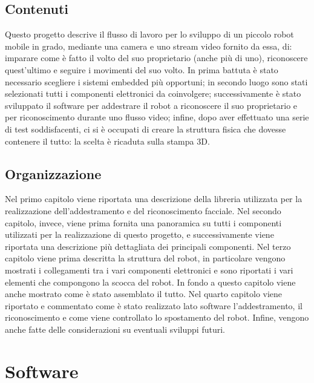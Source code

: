 \documentclass[12pt]{report}
\begin{document}
\section*{Contenuti}
Questo progetto descrive il flusso di lavoro per lo sviluppo di un piccolo robot mobile in grado, mediante una camera e uno stream video fornito da essa, di: imparare come \`e fatto il volto del suo proprietario (anche pi\`u di uno), riconoscere quest'ultimo e seguire i movimenti del suo volto. In prima battuta \`e
stato necessario scegliere i sistemi embedded pi\`u opportuni; in secondo luogo sono stati selezionati tutti i componenti elettronici da coinvolgere; successivamente \`e stato sviluppato il software per addestrare il robot a riconoscere il suo proprietario e per riconoscimento durante uno flusso video; infine, dopo aver effettuato una serie di test soddisfacenti, ci si \`e occupati di creare la struttura fisica che dovesse contenere il tutto: la scelta è ricaduta sulla stampa 3D.

	
\section*{Organizzazione}
Nel primo capitolo viene riportata una descrizione della libreria utilizzata per la realizzazione dell'addestramento e del riconoscimento facciale.
Nel secondo capitolo, invece, viene prima fornita una panoramica su tutti i componenti utilizzati per la realizzazione di questo progetto, e successivamente viene riportata una descrizione pi\`u dettagliata dei principali componenti.
Nel terzo capitolo viene prima descritta la struttura del robot, in particolare vengono mostrati i collegamenti tra i vari componenti elettronici e sono riportati i vari elementi che compongono la scocca del robot. In fondo a questo capitolo viene anche mostrato come \`e stato assemblato il tutto.
Nel quarto capitolo viene riportato e commentato come \`e stato realizzato lato software l'addestramento, il riconoscimento e come viene controllato lo spostamento del robot.
Infine, vengono anche fatte delle considerazioni su eventuali sviluppi futuri.
	

\chapter{Software}
\end{document}
